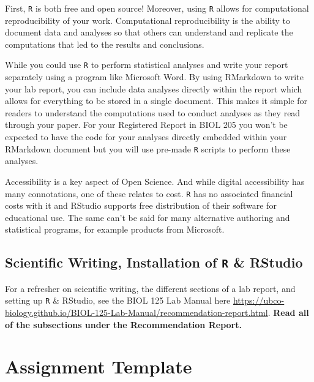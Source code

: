 \documentclass[
]{book}
\begin{document}
First, \texttt{R} is both free and open source! Moreover, using \texttt{R} allows for computational reproducibility of your work. Computational reproducibility is the ability to document data and analyses so that others can understand and replicate the computations that led to the results and conclusions.

While you could use \texttt{R} to perform statistical analyses and write your report separately using a program like Microsoft Word. By using RMarkdown to write your lab report, you can include data analyses directly within the report which allows for everything to be stored in a single document. This makes it simple for readers to understand the computations used to conduct analyses as they read through your paper. For your Registered Report in BIOL 205 you won't be expected to have the code for your analyses directly embedded within your RMarkdown document but you will use pre-made \texttt{R} scripts to perform these analyses.

Accessibility is a key aspect of Open Science. And while digital accessibility has many connotations, one of these relates to cost. \texttt{R} has no associated financial costs with it and RStudio supports free distribution of their software for educational use. The same can't be said for many alternative authoring and statistical programs, for example products from Microsoft.

\hypertarget{scientific-writing-installation-of-r-rstudio}{%
\subsection*{\texorpdfstring{Scientific Writing, Installation of \texttt{R} \& RStudio}{Scientific Writing, Installation of R \& RStudio}}\label{scientific-writing-installation-of-r-rstudio}}

For a refresher on scientific writing, the different sections of a lab report, and setting up \texttt{R} \& RStudio, see the BIOL 125 Lab Manual here \url{https://ubco-biology.github.io/BIOL-125-Lab-Manual/recommendation-report.html}. \textbf{Read all of the subsections under the Recommendation Report.}

\hypertarget{assignment-template}{%
\section*{Assignment Template}\label{assignment-template}}
\end{document}
